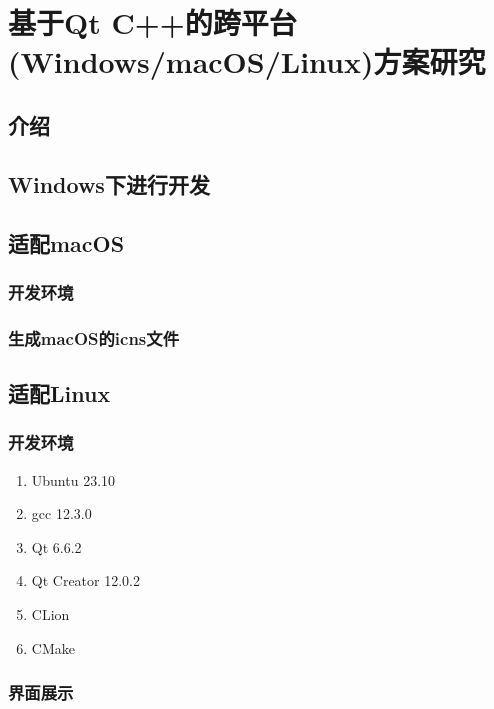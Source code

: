 \chapter{基于Qt C++的跨平台(Windows/macOS/Linux)方案研究}
\label{chapter:11}

\section{介绍}

\section{Windows下进行开发}

\section{适配macOS}

\subsection{开发环境}

\subsection{生成macOS的icns文件}

\section{适配Linux}

\subsection{开发环境}

\begin{enumerate}
	\item Ubuntu 23.10
	\item gcc 12.3.0
	\item Qt 6.6.2
	\item Qt Creator 12.0.2
	\item CLion
	\item CMake
\end{enumerate}

\subsection{界面展示}

